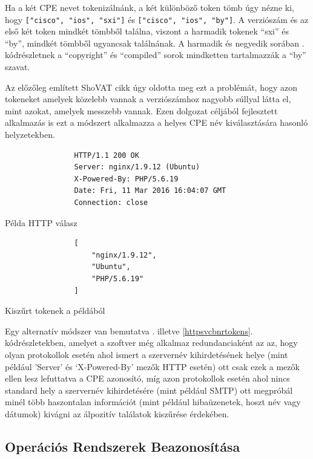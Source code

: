 	Ha a két CPE nevet tokenizálnánk, a két különböző token tömb úgy nézne ki, hogy \texttt{["cisco", "ios", "sxi"]} és \texttt{["cisco", "ios", "by"]}. A verziószám és az első két token mindkét tömbből találna, viszont a harmadik tokenek ``sxi'' és ``by'', mindkét tömbből ugyancsak találnának. A harmadik és negyedik sorában \az{\ref{ciscosvcbnr}}. kódrészletnek a ``copyright'' és ``compiled'' sorok mindketten tartalmazzák a ``by'' szavat.

	Az előzőleg említett ShoVAT\cite{shovat15} cikk úgy oldotta meg ezt a problémát, hogy azon tokeneket amelyek közelebb vannak a verziószámhoz nagyobb súllyal látta el, mint azokat, amelyek messzebb vannak. Ezen dolgozat céljából fejlesztett alkalmazás is ezt a módszert alkalmazza a helyes CPE név kiválasztására hasonló helyzetekben.
	
	\begin{multicols}{2}
		\begin{listing}[H]
			\begin{verbatim}
				HTTP/1.1 200 OK
				Server: nginx/1.9.12 (Ubuntu)
				X-Powered-By: PHP/5.6.19
				Date: Fri, 11 Mar 2016 16:04:07 GMT
				Connection: close
			\end{verbatim}
			\caption{Példa HTTP válasz}
			\label{httpsvcbnr}
		\end{listing}
		\begin{listing}[H]
			\begin{verbatim}
				[
					"nginx/1.9.12",
					"Ubuntu",
					"PHP/5.6.19"
				]
			\end{verbatim}
			\caption{Kiszűrt tokenek a példából}
			\label{httpsvcbnrtokens}
		\end{listing}
	\end{multicols}
	
	Egy alternatív módszer van bemutatva \az{\ref{httpsvcbnr}}. illetve \ref{httpsvcbnrtokens}. kódrészletekben, amelyet a szoftver még alkalmaz redundanciaként az az, hogy olyan protokollok esetén ahol ismert a szervernév kihirdetésének helye (mint például 'Server' és `X-Powered-By' mezők HTTP esetén) ott csak ezek a mezők ellen lesz lefuttatva a CPE azonosító, míg azon protokollok esetén ahol nincs standard hely a szervernév kihirdetésére (mint például SMTP) ott megpróbál minél több haszontalan információt (mint például hibaüzenetek, hoszt név vagy dátumok) kivágni az álpozitív találatok kiszűrése érdekében.

\subsection*{Operációs Rendszerek Beazonosítása} \label{ssec:opsysmatcher}

